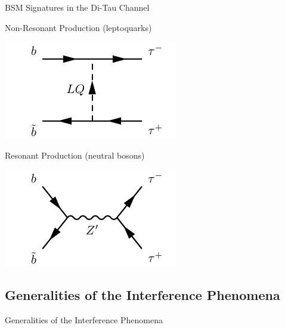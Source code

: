 \documentclass{../bredelebeamer}
\begin{document}
\begin{frame}{BSM Signatures in the Di-Tau Channel}
\begin{minipage}{.48\linewidth}
	Non-Resonant Production (leptoquarks)
	\begin{center}
		\includegraphics[width=.9\linewidth,height=.5\linewidth]{non-res.pdf}
	\end{center}
	
\end{minipage}
\hfill
\begin{minipage}{.48\linewidth}
	Resonant Production (neutral bosons)
	\begin{center}
		\includegraphics[width=.9\linewidth,height=.5\linewidth]{DY.pdf}
	\end{center}
\end{minipage}

\end{frame}

\subsection{Generalities of the Interference Phenomena}
\begin{frame}{Generalities of the Interference Phenomena}
    
\end{frame}
\end{document}
